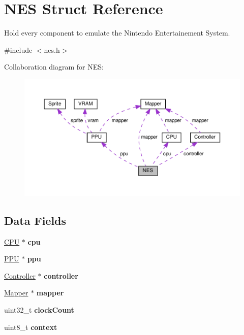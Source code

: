 \hypertarget{struct_n_e_s}{}\section{N\+ES Struct Reference}
\label{struct_n_e_s}


Hold every component to emulate the Nintendo Entertainement System.  




{\ttfamily \#include $<$nes.\+h$>$}



Collaboration diagram for N\+ES\+:\nopagebreak
\begin{figure}[H]
\begin{center}
\leavevmode
\includegraphics[width=350pt]{struct_n_e_s__coll__graph}
\end{center}
\end{figure}
\subsection*{Data Fields}
\begin{DoxyCompactItemize}
\item 
\mbox{\label{struct_n_e_s_a7841e50a9c480edc0df1f395bc792d20}} 
\hyperlink{struct_c_p_u}{C\+PU} $\ast$ {\bfseries cpu}
\item 
\mbox{\label{struct_n_e_s_a19ff22373983c5d02166b6c29f2de187}} 
\hyperlink{struct_p_p_u}{P\+PU} $\ast$ {\bfseries ppu}
\item 
\mbox{\label{struct_n_e_s_acaf0644c14bf7a45d314781c4168cb83}} 
\hyperlink{struct_controller}{Controller} $\ast$ {\bfseries controller}
\item 
\mbox{\label{struct_n_e_s_a2a9230344a369ccd1d395edd03dd6827}} 
\hyperlink{struct_mapper}{Mapper} $\ast$ {\bfseries mapper}
\item 
\mbox{\label{struct_n_e_s_abf614a5e77e47c9622abbc45420cb567}} 
uint32\+\_\+t {\bfseries clock\+Count}
\item 
\mbox{\label{struct_n_e_s_af3db2773a8619d9a7c7729880f808113}} 
uint8\+\_\+t {\bfseries context}
\end{DoxyCompactItemize}


